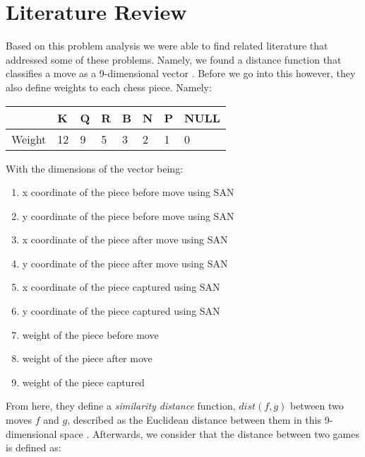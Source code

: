 \documentclass[12pt]{article}
\begin{document}
    \section{Literature Review}

    Based on this problem analysis we were able to find related literature that addressed some of these problems. Namely, we found a distance function that classifies a move as a 9-dimensional vector \cite{main}. Before we go into this however, they also define weights to each chess piece. Namely: 

    \begin{table}[ht]
        \begin{tabular}{|l|l|l|l|l|l|l|l|}
        \hline
            & K  & Q & R & B & N & P & NULL \\ \hline
        Weight & 12 & 9 & 5 & 3 & 2 & 1 & 0    \\ \hline
        \end{tabular}
    \end{table}

    With the dimensions of the vector being: 

    \begin{singlespace}
        \begin{enumerate}
            \item x coordinate of the piece before move using SAN 
            \item y coordinate of the piece before move using SAN 
            \item x coordinate of the piece after move using SAN 
            \item y coordinate of the piece after move using SAN 
            \item x coordinate of the piece captured using SAN 
            \item y coordinate of the piece captured using SAN 
            \item weight of the piece before move 
            \item weight of the piece after move 
            \item weight of the piece captured
        \end{enumerate}
    \end{singlespace}

    From here, they define a \textit{similarity distance} function, $dist(f,g)$ between two moves $f$ and $g$, described as the Euclidean distance between them in this 9-dimensional space \cite{main}. Afterwards, we consider that the distance between two games is defined as:
\end{document}
